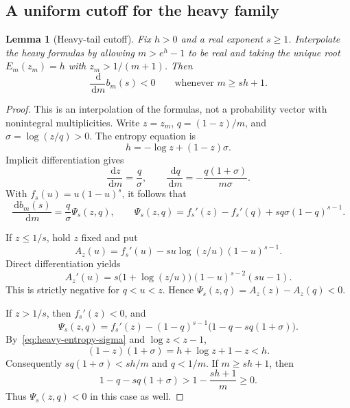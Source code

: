 \documentclass[11pt]{article}
\numberwithin{equation}{section}
\newtheorem{lemma}[theorem]{Lemma}
\newcommand{\dd}{\,\mathrm d}
\begin{document}
\subsection{A uniform cutoff for the heavy family}
\begin{lemma}[Heavy-tail cutoff]\label{lem:cutoff}
Fix $h>0$ and a real exponent $s\ge1$. Interpolate the heavy formulas by
allowing $m>e^h-1$ to be real and taking the unique root
$E_m(z_m)=h$ with $z_m>1/(m+1)$. Then
\begin{equation}\label{eq:cutoff-decrease}
 \frac{\dd}{\dd m}b_m(s)<0\qquad\text{whenever }m\ge sh+1.
\end{equation}
\end{lemma}
\begin{proof}
This is an interpolation of the formulas, not a probability vector with
nonintegral multiplicities. Write $z=z_m$, $q=(1-z)/m$, and
$\sigma=\log(z/q)>0$. The entropy equation is
\begin{equation}\label{eq:heavy-entropy-sigma}
 h=-\log z+(1-z)\sigma.
\end{equation}
Implicit differentiation gives
\begin{equation}\label{eq:heavy-m-derivatives}
 \frac{\dd z}{\dd m}=\frac q\sigma,
 \qquad
 \frac{\dd q}{\dd m}=-\frac{q(1+\sigma)}{m\sigma}.
\end{equation}
With $f_s(u)=u(1-u)^s$, it follows that
\begin{equation}\label{eq:heavy-objective-derivative}
 \frac{\dd b_m(s)}{\dd m}=\frac q\sigma\Psi_s(z,q),\qquad
 \Psi_s(z,q)=f_s'(z)-f_s'(q)+sq\sigma(1-q)^{s-1}.
\end{equation}

If $z\le1/s$, hold $z$ fixed and put
\[
 A_z(u)=f_s'(u)-su\log(z/u)(1-u)^{s-1}.
\]
Direct differentiation yields
\[
 A_z'(u)=s\bigl(1+\log(z/u)\bigr)(1-u)^{s-2}(su-1).
\]
This is strictly negative for $q<u<z$. Hence
$\Psi_s(z,q)=A_z(z)-A_z(q)<0$.

If $z>1/s$, then $f_s'(z)<0$, and
\[
 \Psi_s(z,q)=f_s'(z)
 -(1-q)^{s-1}\bigl(1-q-sq(1+\sigma)\bigr).
\]
By~\eqref{eq:heavy-entropy-sigma} and $\log z<z-1$,
\[
 (1-z)(1+\sigma)=h+\log z+1-z<h.
\]
Consequently $sq(1+\sigma)<sh/m$ and $q<1/m$. If $m\ge sh+1$, then
\[
 1-q-sq(1+\sigma)>1-\frac{sh+1}{m}\ge0.
\]
Thus $\Psi_s(z,q)<0$ in this case as well.
\end{proof}
\end{document}
